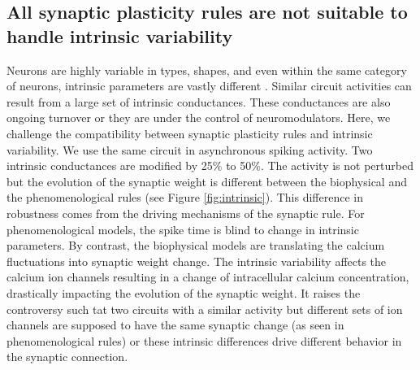 \subsection{All synaptic plasticity rules are not suitable to handle intrinsic variability}
Neurons are highly variable in types, shapes, and even within the same category of neurons, intrinsic parameters are vastly different \citep{marder_multiple_2011}. Similar circuit activities can result from a large set of intrinsic conductances. These conductances are also ongoing turnover or they are under the control of neuromodulators. Here, we challenge the compatibility between synaptic plasticity rules and intrinsic variability. We use the same circuit in asynchronous spiking activity. Two intrinsic conductances are modified by 25$\%$ to 50$\%$. The activity is not perturbed but the evolution of the synaptic weight is different between the biophysical and the phenomenological rules (see Figure \ref{fig:intrinsic}). This difference in robustness comes from the driving mechanisms of the synaptic rule. For phenomenological models, the spike time is blind to change in intrinsic parameters. By contrast, the biophysical models are translating the calcium fluctuations into synaptic weight change. The intrinsic variability affects the calcium ion channels resulting in a change of intracellular calcium concentration, drastically impacting the evolution of the synaptic weight. It raises the controversy such tat two circuits with a similar activity but different sets of ion channels are supposed to have the same synaptic change (as seen in phenomenological rules) or these intrinsic differences drive different behavior in the synaptic connection. 


